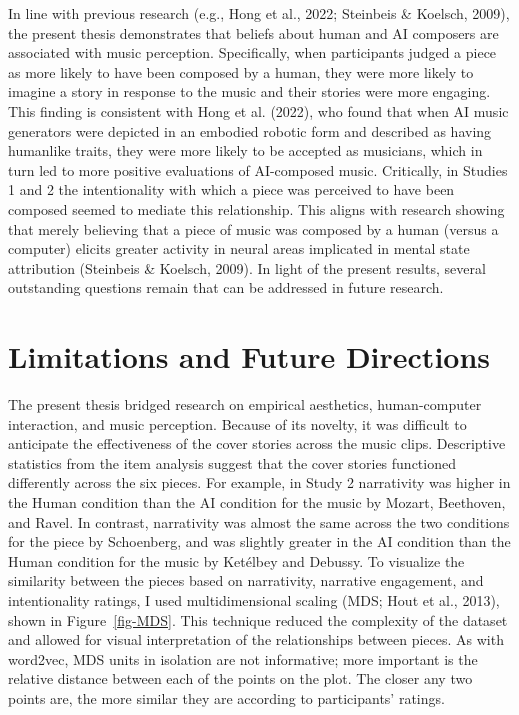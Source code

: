 \documentclass[12pt,twoside]{reedthesis}
\begin{document}
In line with previous research (e.g., Hong et al., 2022; Steinbeis \& Koelsch, 2009), the present thesis demonstrates that beliefs about human and AI composers are associated with music perception. Specifically, when participants judged a piece as more likely to have been composed by a human, they were more likely to imagine a story in response to the music and their stories were more engaging. This finding is consistent with Hong et al. (2022), who found that when AI music generators were depicted in an embodied robotic form and described as having humanlike traits, they were more likely to be accepted as musicians, which in turn led to more positive evaluations of AI-composed music. Critically, in Studies 1 and 2 the intentionality with which a piece was perceived to have been composed seemed to mediate this relationship. This aligns with research showing that merely believing that a piece of music was composed by a human (versus a computer) elicits greater activity in neural areas implicated in mental state attribution (Steinbeis \& Koelsch, 2009). In light of the present results, several outstanding questions remain that can be addressed in future research. 



\section*{Limitations and Future Directions}

The present thesis bridged research on empirical aesthetics, human-computer interaction, and music perception. Because of its novelty, it was difficult to anticipate the effectiveness of the cover stories across the music clips. Descriptive statistics from the item analysis suggest that the cover stories functioned differently across the six pieces. For example, in Study 2 narrativity was higher in the Human condition than the AI condition for the music by Mozart, Beethoven, and Ravel. In contrast, narrativity was almost the same across the two conditions for the piece by Schoenberg, and was slightly greater in the AI condition than the Human condition for the music by Ketélbey and Debussy. To visualize the similarity between the pieces based on narrativity, narrative engagement, and intentionality ratings, I used multidimensional scaling (MDS; Hout et al., 2013), shown in Figure~\ref*{fig-MDS}. This technique reduced the complexity of the dataset and allowed for visual interpretation of the relationships between pieces.  As with word2vec, MDS units in isolation are not informative; more important is the relative distance between each of the points on the plot. The closer any two points are, the more similar they are according to participants' ratings. 
\end{document}
